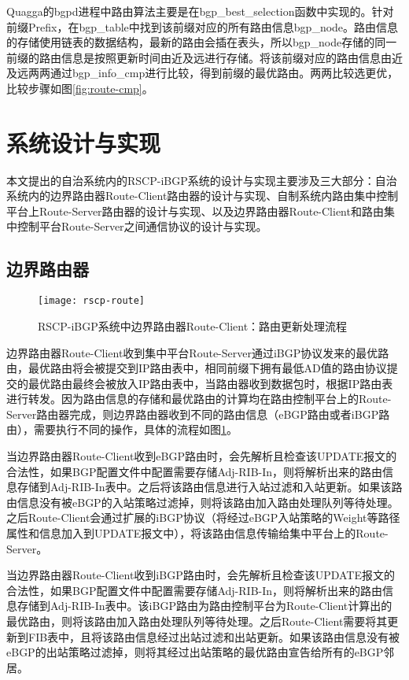 Quagga的bgpd进程中路由算法主要是在bgp\_best\_selection函数中实现的。针对前缀Prefix，在bgp\_table中找到该前缀对应的所有路由信息bgp\_node。路由信息的存储使用链表的数据结构，最新的路由会插在表头，所以bgp\_node存储的同一前缀的路由信息是按照更新时间由近及远进行存储。将该前缀对应的路由信息由近及远两两通过bgp\_info\_cmp进行比较，得到前缀的最优路由。两两比较选更优，比较步骤如图\ref{fig:route-cmp}。


\section{系统设计与实现}


本文提出的自治系统内的RSCP-iBGP系统的设计与实现主要涉及三大部分：自治系统内的边界路由器Route-Client路由器的设计与实现、自制系统内路由集中控制平台上Route-Server路由器的设计与实现、以及边界路由器Route-Client和路由集中控制平台Route-Server之间通信协议的设计与实现。


\subsection{边界路由器}

\begin{figure}
  \centering
  \texttt{[image: rscp-route]}
  \caption{RSCP-iBGP系统中边界路由器Route-Client：路由更新处理流程}
  \label{fig:rscp-route}
\end{figure}



边界路由器Route-Client收到集中平台Route-Server通过iBGP协议发来的最优路由，最优路由将会被提交到IP路由表中，相同前缀下拥有最低AD值的路由协议提交的最优路由最终会被放入IP路由表中，当路由器收到数据包时，根据IP路由表进行转发\cite{DianeTeare2016CCNP}。因为路由信息的存储和最优路由的计算均在路由控制平台上的Route-Server路由器完成，则边界路由器收到不同的路由信息（eBGP路由或者iBGP路由），需要执行不同的操作，具体的流程如图\ref{fig:rscp-route}。

当边界路由器Route-Client收到eBGP路由时，会先解析且检查该UPDATE报文的合法性，如果BGP配置文件中配置需要存储Adj-RIB-In，则将解析出来的路由信息存储到Adj-RIB-In表中。之后将该路由信息进行入站过滤和入站更新。如果该路由信息没有被eBGP的入站策略过滤掉，则将该路由加入路由处理队列等待处理。之后Route-Client会通过扩展的iBGP协议（将经过eBGP入站策略的Weight等路径属性和信息加入到UPDATE报文中），将该路由信息传输给集中平台上的Route-Server。


当边界路由器Route-Client收到iBGP路由时，会先解析且检查该UPDATE报文的合法性，如果BGP配置文件中配置需要存储Adj-RIB-In，则将解析出来的路由信息存储到Adj-RIB-In表中。该iBGP路由为路由控制平台为Route-Client计算出的最优路由，则将该路由加入路由处理队列等待处理。之后Route-Client需要将其更新到FIB表中，且将该路由信息经过出站过滤和出站更新。如果该路由信息没有被eBGP的出站策略过滤掉，则将其经过出站策略的最优路由宣告给所有的eBGP邻居。



